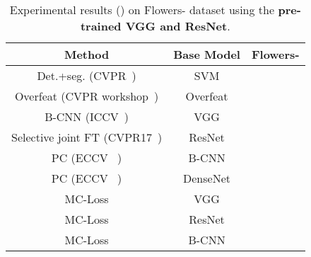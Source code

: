 \documentclass[journal]{IEEEtran}
\begin{document}
\begin{table}[!t]
\centering
  \caption{Experimental results () on Flowers- dataset using the \textbf{pre-trained VGG and ResNet}.}
\footnotesize
    \begin{tabular}{|c|c|c|}
    \hline
    Method                                             & Base Model              & Flowers- \\
    \hline
    \hline
    Det.+seg. (CVPR~\cite{angelova2013efficient})  & SVM                     & \\
    Overfeat (CVPR workshop~\cite{sharif2014cnn})  & Overfeat                & \\
B-CNN (ICCV~\cite{lin2015bilinear})            & VGG                 & \\
    Selective joint FT (CVPR17~\cite{ge2017borrowing}) & ResNet             & \\
    PC (ECCV~\cite{dubey2018pairwise} )            & B-CNN                   & \\
    PC (ECCV~\cite{dubey2018pairwise} )            & DenseNet           & \\
    \hline
    \hline
    MC-Loss                                            & VGG                 & \\
    MC-Loss                                            & ResNet              & \\
    MC-Loss                                            & B-CNN                   & \\
    \hline
    \end{tabular}\label{tab:SOTA_flowers102}

\end{table}
\end{document}

